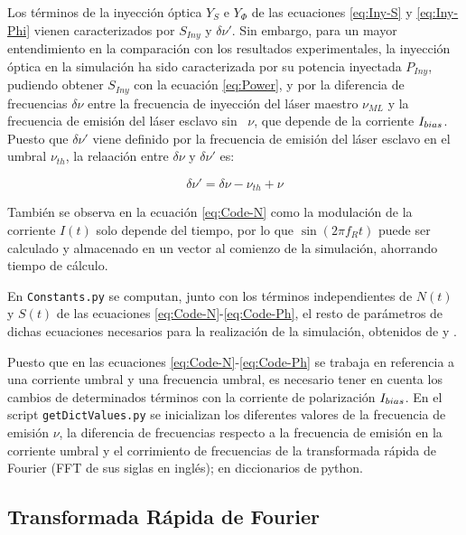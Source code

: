 		Los t\'erminos de la inyecci\'on \'optica $Y_S$ e $Y_{\Phi}$ de las ecuaciones \ref{eq:Iny-S} y \ref{eq:Iny-Phi} vienen caracterizados por $S_{Iny}$ y $\delta\nu'$. Sin embargo, para un mayor entendimiento en la comparaci\'on con los resultados experimentales, la inyecci\'on \'optica en la simulaci\'on ha sido caracterizada por su potencia inyectada $P_{Iny}$, pudiendo obtener $S_{Iny}$ con la ecuaci\'on \ref{eq:Power}, y por la diferencia de frecuencias $\delta\nu$ entre la frecuencia de inyecci\'on del l\'aser maestro $\nu_{ML}$ y la frecuencia de emisi\'on del l\'aser esclavo sin \gs\ $\nu$, que depende de la corriente $I_{bias}$. Puesto que $\delta\nu'$ viene definido por la frecuencia de emisi\'on del l\'aser esclavo en el umbral $\nu_{th}$, la relaación entre $\delta\nu$ y $\delta\nu'$ es:

			\begin{equation}
				\delta\nu' = \delta\nu - \nu_{th} + \nu
			\end{equation}

		Tambi\'en se observa en la ecuaci\'on \ref{eq:Code-N} como la modulaci\'on de la corriente $I(t)$ solo depende del tiempo, por lo que $\sin(2\pi f_R t)$ puede ser calculado y almacenado en un vector al comienzo de la simulaci\'on, ahorrando tiempo de c\'alculo.

		En \texttt{Constants.py} se computan, junto con los t\'erminos independientes de $N(t)$ y $S(t)$ de las ecuaciones \ref{eq:Code-N}-\ref{eq:Code-Ph}, el resto de par\'ametros de dichas ecuaciones necesarios para la realizaci\'on de la simulaci\'on, obtenidos de \cite{artSim} y \cite{Chaves19}.

		Puesto que en las ecuaciones \ref{eq:Code-N}-\ref{eq:Code-Ph} se trabaja en referencia a una corriente umbral y una frecuencia umbral, es necesario tener en cuenta los cambios de determinados t\'erminos con la corriente de polarización $I_{bias}$. En el script \texttt{getDictValues.py} se inicializan los diferentes valores de la frecuencia de emisión $\nu$, la diferencia de frecuencias respecto a la frecuencia de emisi\'on en la corriente umbral \cite{Chaves19} y el corrimiento de frecuencias de la transformada r\'apida de Fourier (FFT de sus siglas en ingl\'es); en diccionarios de python.

	\subsection{Transformada R\'apida de Fourier}
		\label{Mdl:Code:FFT}

